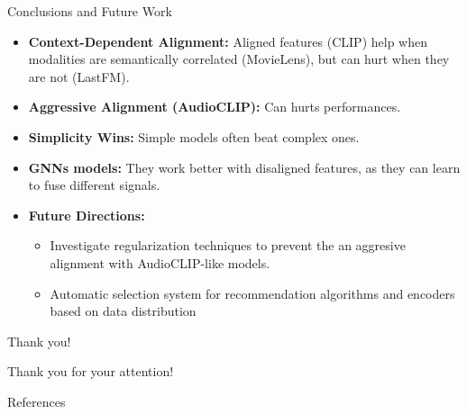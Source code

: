 \documentclass[aspectratio=169]{beamer}
\begin{document}
\begin{frame}{Conclusions and Future Work}
  \begin{itemize}
    \item \textbf{Context-Dependent Alignment:} Aligned features (CLIP) help when modalities are semantically correlated (MovieLens), but can hurt when they are not (LastFM).
    \item \textbf{Aggressive Alignment (AudioCLIP):} Can hurts performances.
    \item \textbf{Simplicity Wins:} Simple models often beat complex ones.
    \item \textbf{GNNs models:} They work better with disaligned features, as they can learn to fuse different signals.
    \item \textbf{Future Directions:}
    \begin{itemize}
        \item Investigate regularization techniques to prevent the an aggresive alignment with AudioCLIP-like models.
        \item Automatic selection system for recommendation algorithms and encoders based on data distribution
    \end{itemize}
  \end{itemize}
\end{frame}

\begin{frame}{Thank you!}
  \begin{center}
    \huge{ Thank you for your attention!  }
  \end{center}
\end{frame}

\begin{frame}[allowframebreaks]{References}
  
  
\end{frame}
\end{document}
